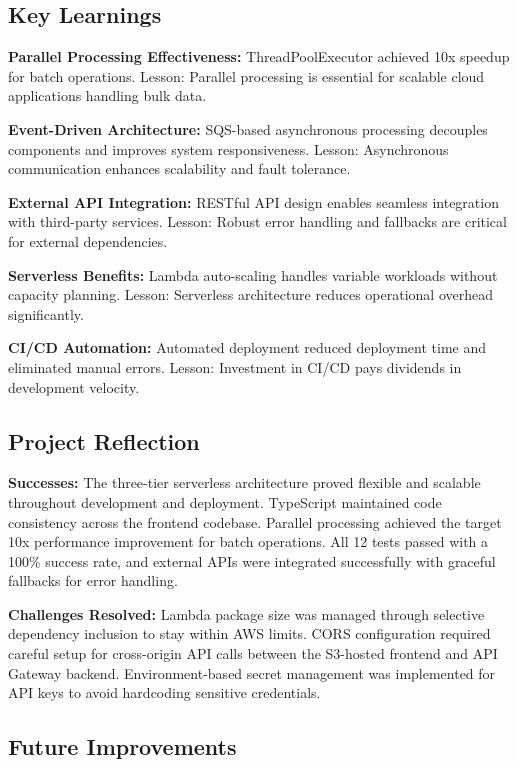 \documentclass[conference]{IEEEtran}
\begin{document}
\subsection{Key Learnings}

\textbf{Parallel Processing Effectiveness:} ThreadPoolExecutor achieved 10x speedup for batch operations. Lesson: Parallel processing is essential for scalable cloud applications handling bulk data.

\textbf{Event-Driven Architecture:} SQS-based asynchronous processing decouples components and improves system responsiveness. Lesson: Asynchronous communication enhances scalability and fault tolerance.

\textbf{External API Integration:} RESTful API design enables seamless integration with third-party services. Lesson: Robust error handling and fallbacks are critical for external dependencies.

\textbf{Serverless Benefits:} Lambda auto-scaling handles variable workloads without capacity planning. Lesson: Serverless architecture reduces operational overhead significantly.

\textbf{CI/CD Automation:} Automated deployment reduced deployment time and eliminated manual errors. Lesson: Investment in CI/CD pays dividends in development velocity.

\subsection{Project Reflection}

\textbf{Successes:} The three-tier serverless architecture proved flexible and scalable throughout development and deployment. TypeScript maintained code consistency across the frontend codebase. Parallel processing achieved the target 10x performance improvement for batch operations. All 12 tests passed with a 100\% success rate, and external APIs were integrated successfully with graceful fallbacks for error handling.

\textbf{Challenges Resolved:} Lambda package size was managed through selective dependency inclusion to stay within AWS limits. CORS configuration required careful setup for cross-origin API calls between the S3-hosted frontend and API Gateway backend. Environment-based secret management was implemented for API keys to avoid hardcoding sensitive credentials.

\subsection{Future Improvements}
\end{document}
